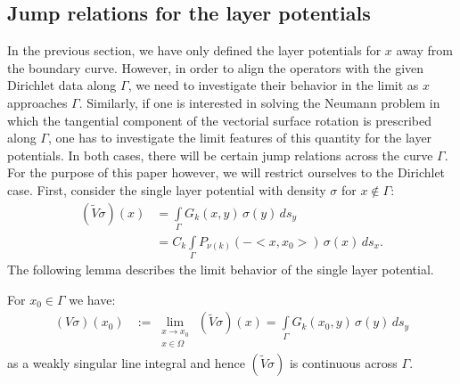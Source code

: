 \documentclass[final]{siamltex}
\begin{document}
\subsection{Jump relations for the layer potentials} 
In the previous section, we have only defined the layer potentials for
$x$ away from the boundary curve. However, in order to align the
operators with the given Dirichlet data along $\Gamma$, we need to
investigate their behavior in the limit as $x$ approaches $\Gamma$.
Similarly, if one is interested in solving the Neumann problem in which
the tangential component of the vectorial surface rotation is
prescribed along $\Gamma$, one has to investigate the limit features of
this quantity for the layer potentials. In both cases, there will be
certain jump relations across the curve $\Gamma$. For the purpose of
this paper however, we will restrict ourselves to the Dirichlet case.
First, consider the single layer potential with density $\sigma$ for
$x \notin \Gamma$:
\begin{align*}
  (\widetilde{V}\sigma)(x) & =  \int\limits_\Gamma
  G_k(x,y)\,\sigma(y)\,ds_{y} \\
  & = C_k \int\limits_\Gamma P_{\nu(k)}(-<x,x_{0}>)\,\sigma(x)\,ds_{x}.
\end{align*}
The following lemma describes the limit behavior of the single layer potential.
\begin{lemma}
For $x_{0}\in\Gamma$ we have:
\begin{align*} 
  (V\sigma)(x_0) & := \lim\limits_{\substack{
      x \to x_{0} \\ x \in \Omega}}
  \,(\widetilde{V}\sigma)(x) = \int\limits_\Gamma G_k(x_{0},y)\,\sigma(y)\,ds_{y}
\end{align*}
as a weakly singular line integral and hence $(\widetilde{V}\sigma)$ is continuous across $\Gamma$.
\end{lemma}
\end{document}
